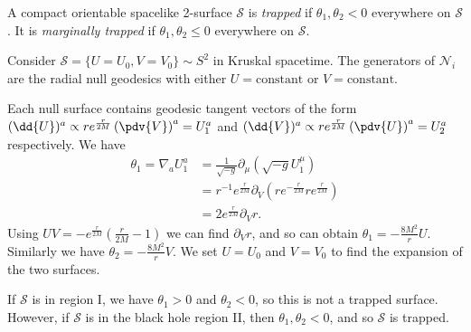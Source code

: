 \documentclass{jknotes}
\begin{document}
\begin{defn}
    A compact orientable spacelike 2-surface \(\mathcal{S}\) is \emph{trapped} if \(\theta_1, \theta_2 < 0\) everywhere on \(\mathcal{S}\). It is \emph{marginally trapped} if \(\theta_1, \theta_2 \le 0\) everywhere on \(\mathcal{S}\).
\end{defn}

\begin{eg}
    Consider \(\mathcal{S} = \{U=U_0,V=V_0\} \sim S^2\) in Kruskal spacetime. The generators of \(\mathcal{N}_i\) are the radial null geodesics with either \(U=\text{constant}\) or \(V=\text{constant}\).
    \begin{figure}[H]
        \centering
    \end{figure}
    Each null surface contains geodesic tangent vectors of the form \((\dd{U})^a\propto re^{\frac{r}{2M}}\left(\pdv{V}\right)^a = U_1^a\) and \((\dd{V})^a\propto re^{\frac{r}{2M}}\left(\pdv{U}\right)^a = U_2^a\) respectively. We have
    \begin{align}
        \theta_1 = \nabla_aU_1^a &= \frac{1}{\sqrt{-g}}\partial_\mu(\sqrt{-g}U_1^\mu) \\
                                 &= r^{-1}e^{\frac{r}{2M}}\partial_V(re^{-\frac{r}{2M}}re^{\frac{r}{2M}}) \\
                                 &= 2e^{\frac{r}{2M}} \partial_V r.
    \end{align}
    Using \(UV = -e^{\frac{r}{2M}}\left(\frac{r}{2M}-1\right)\) we can find \(\partial_V r\), and so can obtain \(\theta_1 = -\frac{8M^2}{r}U\). Similarly we have \(\theta_2 = -\frac{8M^2}{r}V\). We set \(U=U_0\) and \(V=V_0\) to find the expansion of the two surfaces.

    If \(\mathcal{S}\) is in region I, we have \(\theta_1>0\) and \(\theta_2<0\), so this is not a trapped surface. However, if \(\mathcal{S}\) is in the black hole region II, then \(\theta_1, \theta_2 < 0\), and so \(\mathcal{S}\) is trapped.
\end{eg}
\end{document}
